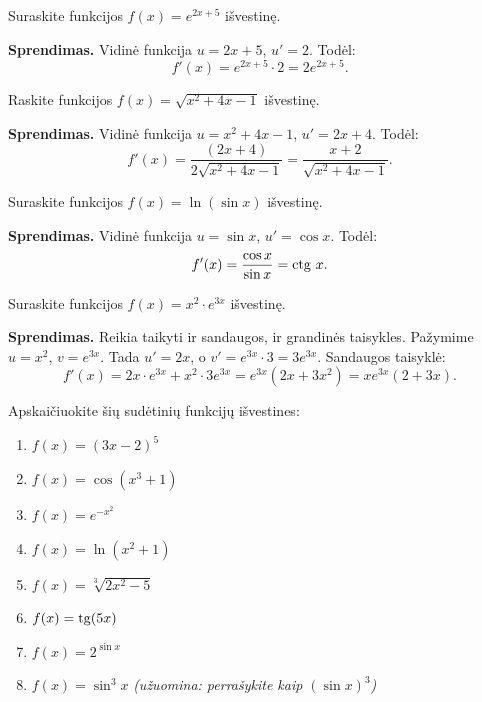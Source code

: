 \begin{example}
Suraskite funkcijos $f(x) = e^{2x+5}$ išvestinę.

\textbf{Sprendimas.} Vidinė funkcija $u = 2x+5$, $u' = 2$. Todėl:
\[
    f'(x) = e^{2x+5}\cdot 2 = 2e^{2x+5}.
\]
\end{example}

\begin{example}
Raskite funkcijos $f(x) = \sqrt{x^2 + 4x - 1}$ išvestinę.

\textbf{Sprendimas.} Vidinė funkcija $u = x^2+4x-1$, $u' = 2x+4$. Todėl:
\[
    f'(x) = \frac{(2x+4)}{2\sqrt{x^2+4x-1}} = \frac{x+2}{\sqrt{x^2+4x-1}}.
\]
\end{example}

\begin{example}
Suraskite funkcijos $f(x) = \ln(\sin x)$ išvestinę.

\textbf{Sprendimas.} Vidinė funkcija $u = \sin x$, $u' = \cos x$. Todėl:
\[
    f'(x) = \frac{\cos x}{\sin x} = \operatorname{ctg}\, x.
\]
\end{example}

\begin{example}
Suraskite funkcijos $f(x) = x^2 \cdot e^{3x}$ išvestinę.

\textbf{Sprendimas.} Reikia taikyti ir sandaugos, ir grandinės taisykles.
Pažymime $u = x^2$, $v = e^{3x}$. Tada $u' = 2x$, o $v' = e^{3x}\cdot 3 = 3e^{3x}$.
Sandaugos taisyklė:
\[
    f'(x) = 2x \cdot e^{3x} + x^2 \cdot 3e^{3x} = e^{3x}(2x + 3x^2) = xe^{3x}(2 + 3x).
\]
\end{example}

\begin{exercise}
Apskaičiuokite šių sudėtinių funkcijų išvestines:
\begin{enumerate}[label=\arabic*.]
    \item $f(x) = (3x - 2)^5$
    \item $f(x) = \cos(x^3 + 1)$
    \item $f(x) = e^{-x^2}$
    \item $f(x) = \ln(x^2 + 1)$
    \item $f(x) = \sqrt[3]{2x^2 - 5}$
    \item $f(x) = \operatorname{tg}(5x)$
    \item $f(x) = 2^{\sin x}$
    \item $f(x) = \sin^3 x$ \quad \textit{(užuomina: perrašykite kaip $(\sin x)^3$)}
\end{enumerate}
\end{exercise}


